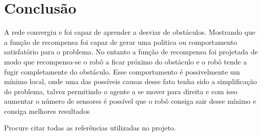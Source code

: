 \documentclass[
	12pt,				%
	openright,			%
	oneside,			%
	a4paper,			%
	brazil,				%
	]{abntex2}
\begin{document}
\chapter{Conclusão}
   A rede convergiu e foi capaz de aprender a desviar de obstáculos. Mostrando que a função de recompensa foi capaz de gerar uma politica ou comportamento satisfatório para o problema. No entanto a função de recompensa foi projetada de modo que recompensa-se o robô a ficar próximo do obstáculo e o robô tende a fugir completamente do obstáculo. Esse comportamento é possivelmente um mínimo local, onde uma das possíveis causas desse fato tenha sido a simplificação do problema, talvez permitindo o agente a se mover para direita e com isso aumentar o número de sensores é possível que o robô consiga sair desse mínimo e consiga melhores resultados 
    
%

    Procure citar todas as referências utilizadas no projeto.
\end{document}
